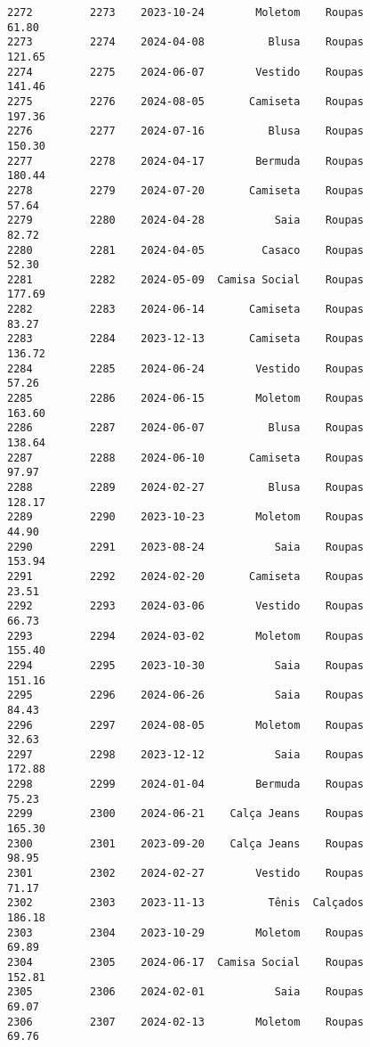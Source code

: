 \documentclass[11pt]{article}
\begin{document}
\begin{Verbatim}[commandchars=\\\{\}]
2272         2273    2023-10-24        Moletom    Roupas           61.80   
2273         2274    2024-04-08          Blusa    Roupas          121.65   
2274         2275    2024-06-07        Vestido    Roupas          141.46   
2275         2276    2024-08-05       Camiseta    Roupas          197.36   
2276         2277    2024-07-16          Blusa    Roupas          150.30   
2277         2278    2024-04-17        Bermuda    Roupas          180.44   
2278         2279    2024-07-20       Camiseta    Roupas           57.64   
2279         2280    2024-04-28           Saia    Roupas           82.72   
2280         2281    2024-04-05         Casaco    Roupas           52.30   
2281         2282    2024-05-09  Camisa Social    Roupas          177.69   
2282         2283    2024-06-14       Camiseta    Roupas           83.27   
2283         2284    2023-12-13       Camiseta    Roupas          136.72   
2284         2285    2024-06-24        Vestido    Roupas           57.26   
2285         2286    2024-06-15        Moletom    Roupas          163.60   
2286         2287    2024-06-07          Blusa    Roupas          138.64   
2287         2288    2024-06-10       Camiseta    Roupas           97.97   
2288         2289    2024-02-27          Blusa    Roupas          128.17   
2289         2290    2023-10-23        Moletom    Roupas           44.90   
2290         2291    2023-08-24           Saia    Roupas          153.94   
2291         2292    2024-02-20       Camiseta    Roupas           23.51   
2292         2293    2024-03-06        Vestido    Roupas           66.73   
2293         2294    2024-03-02        Moletom    Roupas          155.40   
2294         2295    2023-10-30           Saia    Roupas          151.16   
2295         2296    2024-06-26           Saia    Roupas           84.43   
2296         2297    2024-08-05        Moletom    Roupas           32.63   
2297         2298    2023-12-12           Saia    Roupas          172.88   
2298         2299    2024-01-04        Bermuda    Roupas           75.23   
2299         2300    2024-06-21    Calça Jeans    Roupas          165.30   
2300         2301    2023-09-20    Calça Jeans    Roupas           98.95   
2301         2302    2024-02-27        Vestido    Roupas           71.17   
2302         2303    2023-11-13          Tênis  Calçados          186.18   
2303         2304    2023-10-29        Moletom    Roupas           69.89   
2304         2305    2024-06-17  Camisa Social    Roupas          152.81   
2305         2306    2024-02-01           Saia    Roupas           69.07   
2306         2307    2024-02-13        Moletom    Roupas           69.76   

\end{Verbatim}
\end{document}
